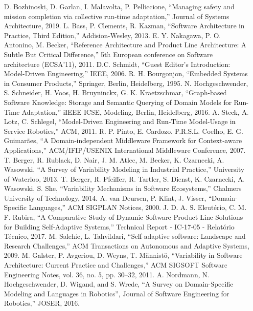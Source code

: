 \documentclass[conference]{IEEEtran}
\begin{document}
\begin{thebibliography}{00}
 D. Bozhinoski, D. Garlan, I. Malavolta, P. Pelliccione, ``Managing safety and mission completion via collective run-time adaptation,'' Journal of Systems Architecture, 2019.
 L. Bass, P. Clements, R. Kazman, ``Software Architecture in Practice, Third Edition,'' Addision-Wesley, 2013.
 E. Y. Nakagawa, P. O. Antonino, M. Becker, ``Reference Architecture and Product Line Architecture: A Subtle But Critical Difference,'' 5th European conference on Software architecture (ECSA'11), 2011.
 D.C. Schmidt, ``Guest Editor's Introduction: Model-Driven Engineering,'' IEEE, 2006.
R. H. Bourgonjon, ``Embedded Systems in Consumer Products,'' Springer, Berlin, Heidelberg, 1995.
 N. Hochgeschwender, S. Schneider, H. Voos, H. Bruyninckx, G. K. Kraetzschmar, ``Graph-based Software Knowledge: Storage and Semantic Querying of Domain Models for Run-Time Adaptation,'' iIEEE ICSE, Modeling, Berlin, Heidelberg, 2016.
 A. Steck, A. Lotz, C. Schlegel, ``Model-Driven Engineering and Run-Time Model-Usage in Service Robotics,'' ACM, 2011.
 R. P. Pinto, E. Cardozo, P.R.S.L. Coelho, E. G. Guimarães, ``A Domain-independent Middleware Framework for Context-aware Applications,'' ACM/IFIP/USENIX International Middleware Conference, 2007.
 T. Berger, R. Rublack, D. Nair, J. M. Atlee, M. Becker, K. Czarnecki, A. Wasowski, ``A Survey of Variability Modeling in Industrial Practice,'' University of Waterloo, 2013.
 T. Berger, R. Pfeiffer, R. Tartler, S. Dienst, K. Czarnecki, A. Wasowski,  S. She, ``Variability Mechanisms in Software Ecosystems,'' Chalmers University of Technology, 2014.
 A. van Deursen, P. Klint, J. Visser, ``Domain-Specific Languages,'' ACM SIGPLAN Notices, 2000.
 J. D. A. S. Eleutério, C. M. F. Rubira, ``A Comparative Study of Dynamic Software Product Line Solutions for Building Self-Adaptive Systems,'' Technical Report - IC-17-05 - Relatório Técnico, 2017.
 M. Salehie, L. Tahvildari, ``Self-adaptive software: Landscape and Research Challenges,'' ACM Transactions on Autonomous and Adaptive Systems, 2009.
 M. Galster, P. Avgeriou, D. Weyns, T. Männistö, ``Variability in Software Architecture: Current Practice and Challenges,'' ACM SIGSOFT Software Engineering Notes, vol. 36, no. 5, pp. 30–32, 2011.
 A. Nordmann, N. Hochgeschwender, D. Wigand, and S. Wrede, ``A Survey on Domain-Specific Modeling and Languages in Robotics”, Journal of Software Engineering for Robotics,'' JOSER, 2016.

\end{thebibliography}
\end{document}
